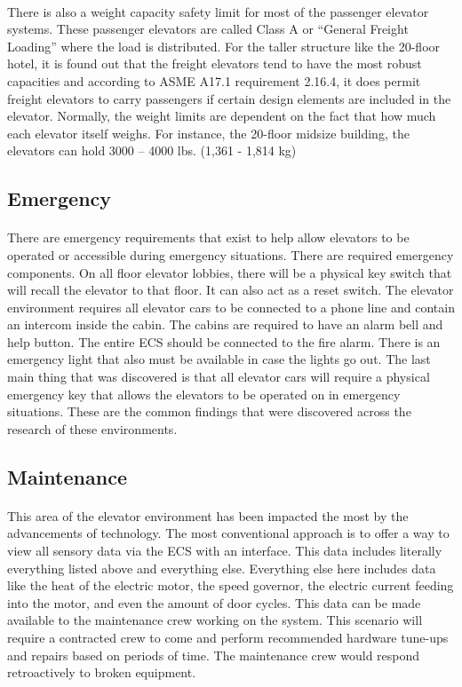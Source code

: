 \documentclass[12pt]{article}
\begin{document}
\paragraph{} There is also a weight capacity safety limit for most of the passenger elevator systems. These passenger elevators are called Class A or “General Freight Loading” where the load is distributed. For the taller structure like the 20-floor hotel, it is found out that the freight elevators tend to have the most robust capacities and according to ASME A17.1 requirement 2.16.4, it does permit freight elevators to carry passengers if certain design elements are included in the elevator. Normally, the weight limits are dependent on the fact that how much each elevator itself weighs. For instance, the 20-floor midsize building, the elevators can hold 3000 – 4000 lbs. (1,361 - 1,814 kg)
\subsection{Emergency}
\paragraph{} There are emergency requirements that exist to help allow elevators to be operated or accessible during emergency situations. There are required emergency components. On all floor elevator lobbies, there will be a physical key switch that will recall the elevator to that floor. It can also act as a reset switch. The elevator environment requires all elevator cars to be connected to a phone line and contain an intercom inside the cabin. The cabins are required to have an alarm bell and help button. The entire ECS should be connected to the fire alarm. There is an emergency light that also must be available in case the lights go out. The last main thing that was discovered is that all elevator cars will require a physical emergency key that allows the elevators to be operated on in emergency situations. These are the common findings that were discovered across the research of these environments.
\subsection{Maintenance}
\paragraph{} This area of the elevator environment has been impacted the most by the advancements of technology. The most conventional approach is to offer a way to view all sensory data via the ECS with an interface. This data includes literally everything listed above and everything else. Everything else here includes data like the heat of the electric motor, the speed governor, the electric current feeding into the motor, and even the amount of door cycles. This data can be made available to the maintenance crew working on the system. This scenario will require a contracted crew to come and perform recommended hardware tune-ups and repairs based on periods of time. The maintenance crew would respond retroactively to broken equipment.
\end{document}
